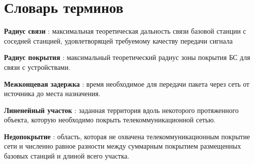 \chapter*{Словарь терминов}             %


\textbf{Радиус связи} : максимальная теоретическая дальность связи базовой станции с соседней станцией, удовлетворящей требуемому качеству передачи сигнала

\textbf{Радиус покрытия} : максимальный теоретический радиус зоны покрытия БС для связи с устройствами.

\textbf{Межконцевая задержка} : время необходимое для передачи пакета через сеть от источника до места назначения.

\textbf{Линенейный участок} : заданная территория вдоль некоторого протяженного объекта, которую необходимо покрыть телекоммуникационной сетью.

\textbf{Недопокрытие} : область, которая не охвачена телекоммуникационным покрытие сети и численно равное разности между суммарным покрытием размещенных базовых станций и длиной всего участка.

